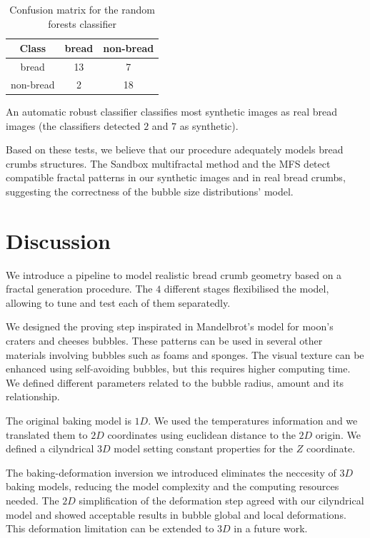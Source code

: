 \documentclass[final,5p,times]{elsarticle}
\begin{document}
\begin{table}[htb]
\centering
\begin{tabular}{c|c|c}
\hline
 Class & bread & non-bread  \\
 \hline
bread & 13 & 7  \\
 non-bread & 2 & 18  \\
 \hline
\end{tabular}
\caption{Confusion matrix for the random forests classifier}
\label{Table3}
\end{table}

An automatic robust classifier classifies most synthetic images as real bread images (the classifiers detected $2$ and $7$ as synthetic).

Based on these tests, we believe that our procedure adequately models bread crumbs structures. The Sandbox multifractal method and the MFS detect compatible fractal patterns in our synthetic images and in real bread crumbs, suggesting the correctness of the bubble size distributions' model.


\section{Discussion}
We introduce a pipeline to model realistic bread crumb geometry based on a fractal generation procedure. The $4$ different stages flexibilised the model, allowing to tune and test each of them separatedly.

We designed the proving step inspirated in Mandelbrot's model for moon's craters and cheeses bubbles. These patterns can be used in several other materials involving bubbles such as foams and sponges. The visual texture can be enhanced using self-avoiding bubbles, but this requires higher computing time. We defined different parameters related to the bubble radius, amount and its relationship.

The original baking model is $1D$. We used the temperatures information  and we translated them to $2D$ coordinates using euclidean distance to the $2D$ origin. We defined a cilyndrical $3D$ model setting constant properties for the $Z$ coordinate. 

The baking-deformation inversion we introduced eliminates the neccesity of $3D$ baking models, reducing the model complexity and the computing resources needed. The $2D$ simplification of the deformation step agreed with our cilyndrical model and showed acceptable results in bubble global and local deformations. This  deformation limitation can be extended to $3D$ in a future work.
\end{document}
